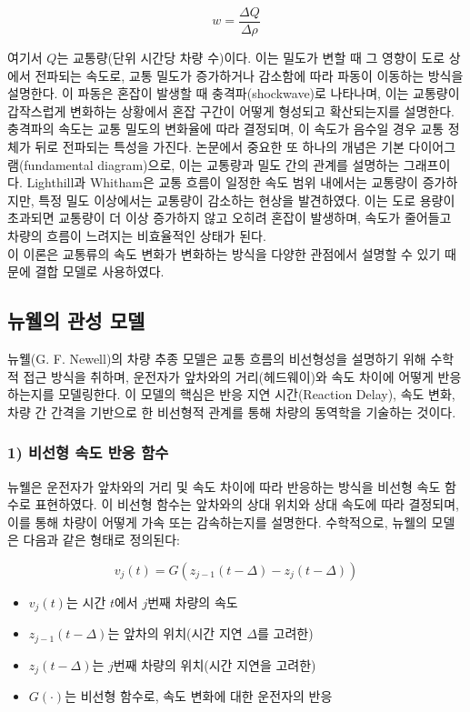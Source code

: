 \documentclass[11pt]{report}
\begin{document}
\[
w = \frac{\Delta Q}{\Delta \rho}
\]

여기서 \(Q\)는 교통량(단위 시간당 차량 수)이다. 이는 밀도가 변할 때 그 영향이 도로 상에서 전파되는 속도로, 교통 밀도가 증가하거나 감소함에 따라 파동이 이동하는 방식을 설명한다. 
이 파동은 혼잡이 발생할 때 충격파(shockwave)로 나타나며, 이는 교통량이 갑작스럽게 변화하는 상황에서 혼잡 구간이 어떻게 형성되고 확산되는지를 설명한다. 
충격파의 속도는 교통 밀도의 변화율에 따라 결정되며, 이 속도가 음수일 경우 교통 정체가 뒤로 전파되는 특성을 가진다. 
논문에서 중요한 또 하나의 개념은 기본 다이어그램(fundamental diagram)으로, 이는 교통량과 밀도 간의 관계를 설명하는 그래프이다. 
Lighthill과 Whitham은 교통 흐름이 일정한 속도 범위 내에서는 교통량이 증가하지만, 특정 밀도 이상에서는 교통량이 감소하는 현상을 발견하였다. 
이는 도로 용량이 초과되면 교통량이 더 이상 증가하지 않고 오히려 혼잡이 발생하며, 속도가 줄어들고 차량의 흐름이 느려지는 비효율적인 상태가 된다. \\
\indent 이 이론은 교통류의 속도 변화가 변화하는 방식을 다양한 관점에서 설명할 수 있기 때문에 결합 모델로 사용하였다. 

\subsection{뉴웰의 관성 모델}
뉴웰(G. F. Newell)의 차량 추종 모델은 교통 흐름의 비선형성을 설명하기 위해 수학적 접근 방식을 취하며, 운전자가 앞차와의 거리(헤드웨이)와 속도 차이에 어떻게 반응하는지를 모델링한다. 
이 모델의 핵심은 반응 지연 시간(Reaction Delay), 속도 변화, 차량 간 간격을 기반으로 한 비선형적 관계를 통해 차량의 동역학을 기술하는 것이다.

\subsubsection*{1) 비선형 속도 반응 함수}
뉴웰은 운전자가 앞차와의 거리 및 속도 차이에 따라 반응하는 방식을 비선형 속도 함수로 표현하였다. 이 비선형 함수는 앞차와의 상대 위치와 상대 속도에 따라 결정되며, 이를 통해 차량이 어떻게 가속 또는 감속하는지를 설명한다. 수학적으로, 뉴웰의 모델은 다음과 같은 형태로 정의된다:

$$
v_j(t) = G\left( z_{j-1}(t - \Delta) - z_j(t - \Delta) \right)
$$

\begin{itemize}
    \item $v_j(t)$는 시간 $t$에서 $j$번째 차량의 속도
    \item $z_{j-1}(t - \Delta)$는 앞차의 위치(시간 지연 $\Delta$를 고려한)
    \item $z_j(t - \Delta)$는 $j$번째 차량의 위치(시간 지연을 고려한)
    \item $G(\cdot)$는 비선형 함수로, 속도 변화에 대한 운전자의 반응
\end{itemize}
\end{document}
